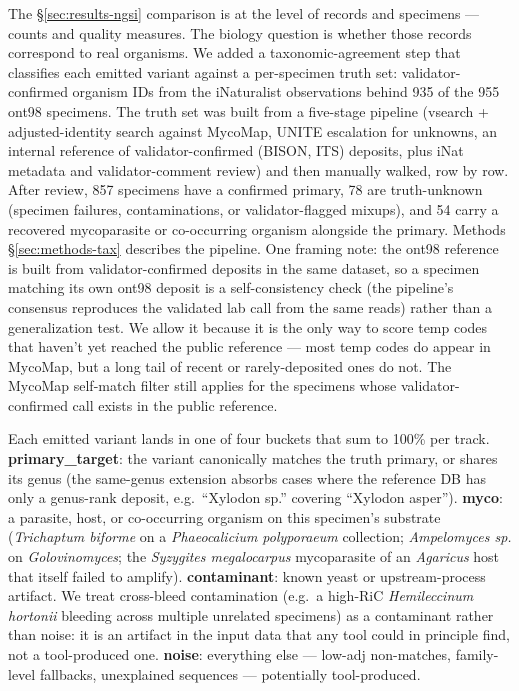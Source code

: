 \documentclass[11pt]{article}
\begin{document}
The §\ref{sec:results-ngsi} comparison is at the level of records and
specimens --- counts and quality measures. The biology question is
whether those records correspond to real organisms. We added a
taxonomic-agreement step that classifies each emitted variant against a
per-specimen truth set: validator-confirmed organism IDs from the
iNaturalist observations behind 935 of the 955 ont98 specimens. The truth
set was built from a five-stage pipeline (vsearch + adjusted-identity
search against MycoMap, UNITE escalation for unknowns, an internal
reference of validator-confirmed (BISON, ITS) deposits, plus iNat
metadata and validator-comment review) and then manually walked, row by
row. After review, 857 specimens have a confirmed primary, 78 are
truth-unknown (specimen failures, contaminations, or validator-flagged
mixups), and 54 carry a recovered mycoparasite or co-occurring organism
alongside the primary. Methods §\ref{sec:methods-tax} describes the
pipeline. One framing note: the ont98 reference is built from
validator-confirmed deposits in the same dataset, so a specimen
matching its own ont98 deposit is a self-consistency check (the
pipeline's consensus reproduces the validated lab call from the same
reads) rather than a generalization test. We allow it because it is
the only way to score temp codes that haven't yet reached the public
reference --- most temp codes do appear in MycoMap, but a long tail of
recent or rarely-deposited ones do not. The MycoMap self-match filter
still applies for the specimens whose validator-confirmed call exists
in the public reference.

Each emitted variant lands in one of four buckets that sum to 100\% per
track. \textbf{primary\_target}: the variant canonically matches the
truth primary, or shares its genus (the same-genus extension absorbs
cases where the reference DB has only a genus-rank deposit, e.g.\
``Xylodon sp.'' covering ``Xylodon asper''). \textbf{myco}: a
parasite, host, or co-occurring organism on this specimen's substrate
(\emph{Trichaptum biforme} on a \emph{Phaeocalicium polyporaeum}
collection; \emph{Ampelomyces sp.} on \emph{Golovinomyces}; the
\emph{Syzygites megalocarpus} mycoparasite of an \emph{Agaricus} host
that itself failed to amplify). \textbf{contaminant}: known yeast or
upstream-process artifact. We treat cross-bleed contamination
(e.g.\ a high-RiC \emph{Hemileccinum hortonii} bleeding across multiple
unrelated specimens) as a contaminant rather than noise: it is an
artifact in the input data that any tool could in principle find, not
a tool-produced one. \textbf{noise}: everything else --- low-adj
non-matches, family-level fallbacks, unexplained sequences ---
potentially tool-produced.
\end{document}

